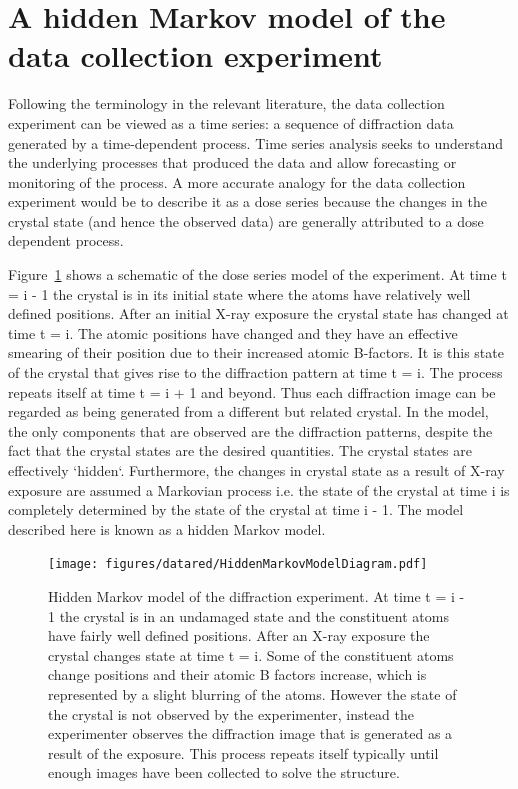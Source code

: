 \section{A hidden Markov model of the data collection experiment}
\label{sec:A hidden Markov model of the data collection experiment}
Following the terminology in the relevant literature, the data collection experiment can be viewed as a time series: a sequence of diffraction data generated by a time-dependent process.
Time series analysis seeks to understand the underlying processes that produced the data and allow forecasting or monitoring of the process.
A more accurate analogy for the data collection experiment would be to describe it as a dose series because the changes in the crystal state (and hence the observed data) are generally attributed to a dose dependent process.

Figure~\ref{fig:Hidden Markov Model diagram} shows a schematic of the dose series model of the experiment.
At time t = i - 1 the crystal is in its initial state where the atoms have relatively well defined positions.
After an initial X-ray exposure the crystal state has changed at time t = i.
The atomic positions have changed and they have an effective smearing of their position due to their increased atomic B-factors.
It is this state of the crystal that gives rise to the diffraction pattern at time t = i.
The process repeats itself at time t = i + 1 and beyond.
Thus each diffraction image can be regarded as being generated from a different but related crystal.
In the model, the only components that are observed are the diffraction patterns, despite the fact that the crystal states are the desired quantities.
The crystal states are effectively `hidden`.
Furthermore, the changes in crystal state as a result of X-ray exposure are assumed a Markovian process i.e. the state of the crystal at time i is completely determined by the state of the crystal at time i - 1.
The model described here is known as a hidden Markov model.
\begin{figure}[ht!]
    \centering
    \texttt{[image: figures/datared/HiddenMarkovModelDiagram.pdf]}
    \caption{Hidden Markov model of the diffraction experiment.
    At time t = i - 1 the crystal is in an undamaged state and the constituent atoms have fairly well defined positions.
    After an X-ray exposure the crystal changes state at time t = i.
    Some of the constituent atoms change positions and their atomic B factors increase, which is represented by a slight blurring of the atoms.
    However the state of the crystal is not observed by the experimenter, instead the experimenter observes the diffraction image that is generated as a result of the exposure.
    This process repeats itself typically until enough images have been collected to solve the structure.}
    \label{fig:Hidden Markov Model diagram}
\end{figure}


